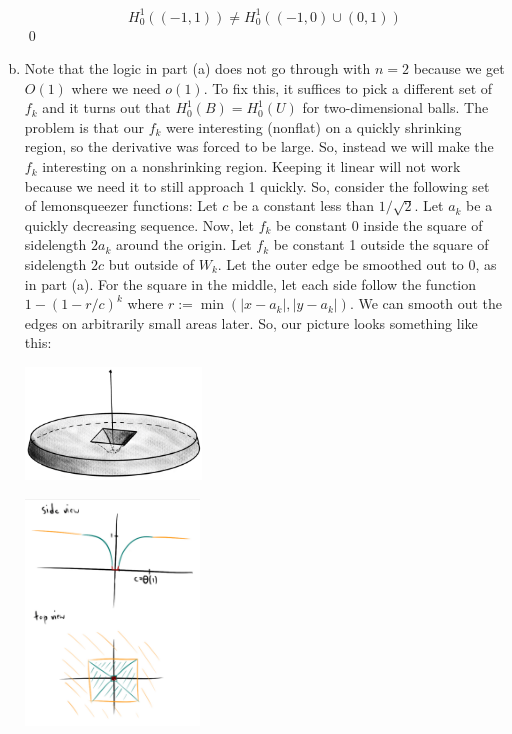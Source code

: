 \documentclass{article}
\begin{document}
\begin{enumerate}[(a)]
    \[ H_0^1((-1,1)) \ne H_0^1((-1,0) \cup (0,1))\]
    \qed
    \item Note that the logic in part (a) does not go through with $n=2$ because we get $O(1)$ where we need $o(1)$. To fix this, it suffices to pick a different set of $f_k$ and it turns out that $H_0^1(B) = H_0^1(U)$ for two-dimensional balls. The problem is that our $f_k$ were interesting (nonflat) on a quickly shrinking region, so the derivative was forced to be large. 
    \hop
    So, instead we will make the $f_k$ interesting on a nonshrinking region. Keeping it linear will not work because we need it to still approach 1 quickly. So, consider the following set of lemonsqueezer functions:
    \hop 
    Let $c$ be a constant less than $1/\sqrt{2}$. Let $a_k$ be a quickly decreasing sequence. Now, let $f_k$ be constant 0 inside the square of sidelength $2a_k$ around the origin. Let $f_k$ be constant 1 outside the square of sidelength $2c$ but outside of $W_k$. Let the outer edge be smoothed out to 0, as in part (a). For the square in the middle, let each side follow the function $1 - (1-r/c)^{k}$ where $r := \min(|x-a_k|, |y-a_k|)$. We can smooth out the edges on arbitrarily small areas later. So, our picture looks something like this: 

    \begin{center}
        \includegraphics[height=3cm]{../images/lemon1}
    \end{center}

    \begin{center}
        \includegraphics[height=6cm]{../images/lemon2}
    \end{center}


\end{enumerate}
\end{document}
